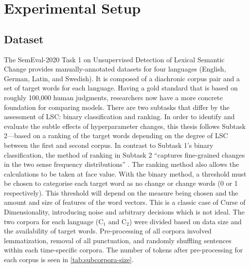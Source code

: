 \section{Experimental Setup}
\label{sec:exp-setup}

\subsection{Dataset}

The SemEval-2020 Task 1 on Unsupervised Detection of Lexical Semantic Change \citep{schlechtweg-etal-2020-semeval} provides manually-annotated datasets for four languages (English, German, Latin, and Swedish). It is composed of a diachronic corpus pair and a set of target words for each language. Having a gold standard that is based on roughly 100,000 human judgments, researchers now have a more concrete foundation for comparing models. There are two subtasks that differ by the assessment of LSC: binary classification and ranking. In order to identify and evaluate the subtle effects of hyperparameter changes, this thesis follows Subtask 2—based on a ranking of the target words depending on the degree of LSC between the first and second corpus. In contrast to Subtask 1’s binary classification, the method of ranking in Subtask 2 “captures fine-grained changes in the two sense frequency distributions” \citep{schlechtweg-etal-2020-semeval}. The ranking method also allows the calculations to be taken at face value. With the binary method, a threshold must be chosen to categorise each target word as no change or change words (0 or 1 respectively). This threshold will depend on the measure being chosen and the amount and size of features of the word vectors. This is a classic case of Curse of Dimensionality, introducing noise and arbitrary decisions which is not ideal. The two corpora for each language (C$_1$ and C$_2$) were divided based on data size and the availability of target words. Pre-processing of all corpora involved lemmatization, removal of all punctuation, and randomly shuffling sentences within each time-specific corpora. The number of tokens after pre-processing for each corpus is seen in \autoref{tab:subcorpora-size}.


